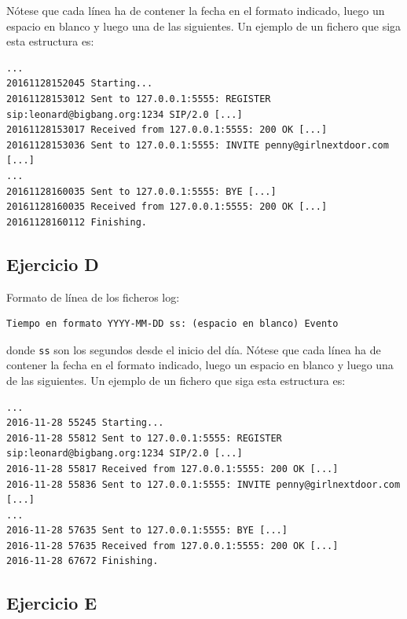\documentclass[a4paper,11pt]{article}
\begin{document}
Nótese que cada línea ha de contener la fecha en el formato indicado, luego
un espacio en blanco y luego una de las siguientes. Un ejemplo de un fichero que siga esta estructura es:

\begin{footnotesize}
\begin{verbatim}
...
20161128152045 Starting...
20161128153012 Sent to 127.0.0.1:5555: REGISTER sip:leonard@bigbang.org:1234 SIP/2.0 [...]
20161128153017 Received from 127.0.0.1:5555: 200 OK [...]
20161128153036 Sent to 127.0.0.1:5555: INVITE penny@girlnextdoor.com [...]
...
20161128160035 Sent to 127.0.0.1:5555: BYE [...]
20161128160035 Received from 127.0.0.1:5555: 200 OK [...]
20161128160112 Finishing.
\end{verbatim}
\end{footnotesize}


\subsection{Ejercicio D}

Formato de línea de los ficheros log:

\begin{footnotesize}
\begin{verbatim}
Tiempo en formato YYYY-MM-DD ss: (espacio en blanco) Evento
\end{verbatim}
\end{footnotesize}

donde \texttt{ss} son los segundos desde el inicio del día. Nótese que cada línea ha de contener la fecha en el formato indicado, luego
un espacio en blanco y luego una de las siguientes. Un ejemplo de un fichero que siga esta estructura es:

\begin{footnotesize}
\begin{verbatim}
...
2016-11-28 55245 Starting...
2016-11-28 55812 Sent to 127.0.0.1:5555: REGISTER sip:leonard@bigbang.org:1234 SIP/2.0 [...]
2016-11-28 55817 Received from 127.0.0.1:5555: 200 OK [...]
2016-11-28 55836 Sent to 127.0.0.1:5555: INVITE penny@girlnextdoor.com [...]
...
2016-11-28 57635 Sent to 127.0.0.1:5555: BYE [...]
2016-11-28 57635 Received from 127.0.0.1:5555: 200 OK [...]
2016-11-28 67672 Finishing.
\end{verbatim}
\end{footnotesize}

\subsection{Ejercicio E}
\end{document}
